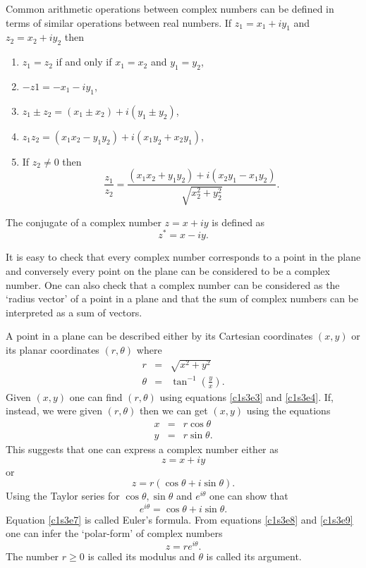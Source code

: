 Common arithmetic operations between complex numbers can be defined in terms of similar
operations between real numbers. If $z_1 = x_1 + iy_1$ and $z_2 = x_2 + iy_2$ then
\begin{enumerate}
\item $z_1 = z_2$ if and only if $x_1 = x_2$ and $y_1 = y_2$,
\item $-z1 = -x_1 - iy_1$,
\item $z_1 \pm z_2 = (x_1 \pm x_2) + i(y_1 \pm y_2)$,
\item $z_1z_2 = (x_1x_2 - y_1y_2) + i(x_1y_2 + x_2y_1)$,
\item If $z_2 \ne 0$ then
\[
\frac{z_1}{z_2} = \frac{(x_1x_2 + y_1y_2) + i(x_2y_1 - x_1y_2)}{\sqrt{x_2^2 + y_2^2}}.
\]
\end{enumerate}

The conjugate of a complex number $z = x + iy$ is defined as
\begin{equation}\label{c1s3e2}
z^\ast = x - iy.
\end{equation}


It is easy to check that every complex number corresponds to a point in the plane and
conversely every point on the plane can be considered to be a complex number. One can
also check that a complex number can be considered as the `radius vector' of a point
in a plane and that the sum of complex numbers can be interpreted as a sum of vectors.

A point in a plane can be described either by its Cartesian coordinates $(x, y)$ or
its planar coordinates $(r, \theta)$ where
\begin{eqnarray}
r &=& \sqrt{x^2 + y^2} \label{c1s3e3} \\
\theta &=& \tan^{-1}\left(\frac{y}{x}\right). \label{c1s3e4}
\end{eqnarray}
Given $(x, y)$ one can find $(r, \theta)$ using equations \eqref{c1s3e3} and 
\eqref{c1s3e4}. If, instead, we were given $(r, \theta)$ then we can get $(x, y)$
using the equations
\begin{eqnarray}
x &=& r\cos\theta \label{c1s3e5} \\
y &=& r\sin\theta. \label{c1s3e6}
\end{eqnarray}
This suggests that one can express a complex number either as 
\begin{equation}\label{c1s3e7}
z = x + iy
\end{equation}
or 
\begin{equation}\label{c1s3e8}
z = r(\cos\theta + i\sin\theta).
\end{equation}
Using the Taylor series for $\cos\theta, \sin\theta$ and $e^{i\theta}$ one can 
show that
\begin{equation}\label{c1s3e9}
e^{i\theta} = \cos\theta + i\sin\theta.
\end{equation}
Equation \eqref{c1s3e7} is called Euler's formula. From equations \eqref{c1s3e8}
and \eqref{c1s3e9} one can infer the `polar-form' of complex numbers
\begin{equation}\label{c1s3e10}
z = re^{i\theta}.
\end{equation}
The number $r \ge 0$ is called its modulus and $\theta$ is called its argument.

